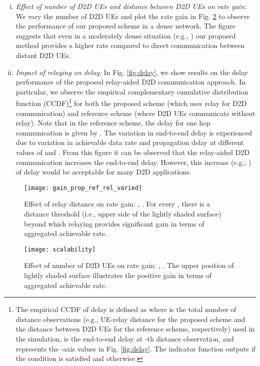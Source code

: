 \documentclass[twocolumn,10pt]{IEEEtran}
\begin{document}
\begin{enumerate}[(i)]
\item \textit{Effect of number of D2D UEs and distance between D2D UEs on rate gain:} We vary the number of D2D UEs and plot the rate gain in Fig. \ref{fig:scal} to observe the performance of our proposed scheme in a dense network. The figure suggests that even in a moderately dense situation (e.g., ) our proposed method provides a higher rate compared to direct communication between distant D2D UEs.


\item \textit{Impact of  relaying on delay:} In Fig. \ref{fig:delay}, we show results on the delay performance of the proposed relay-aided D2D communication approach. In particular, we observe the empirical complementary cumulative distribution function (CCDF)\footnote{The empirical CCDF of delay is defined as  where  is the total number of distance observations (e.g., UE-relay distance for the proposed scheme and the distance between D2D UEs for the reference scheme, respectively) used in the simulation,  is the end-to-end delay at -th distance observation, and   represents the -axis values in Fig. \ref{fig:delay}. The indicator function  outputs  if the condition  is satisfied and  otherwise.} for both the proposed scheme (which uses relay for D2D communication) and reference scheme (where D2D UEs communicate without relay). Note that in the reference scheme, the delay for one hop communication is given by . The variation in end-to-end delay is experienced due to variation in achievable data rate and propagation delay at different values of  and . From this figure it can be observed that the relay-aided D2D communication increases the end-to-end delay. However,  this increase (e.g., ) of delay would be acceptable for many D2D applications.




\end{enumerate}

\begin{figure}[h t b]
\centering
\texttt{[image: gain\_prop\_ref\_rel\_varied]}
\caption{Effect of relay distance on rate gain: ,  . For every , there is a distance threshold (i.e., upper side of the lightly shaded surface) beyond which relaying provides significant gain in terms of aggregated achievable rate.} 
\label{fig:rel_var_mp}
\end{figure}


\begin{figure}[h t b]
\centering
\texttt{[image: scalability]}
\caption{Effect of number of D2D UEs on rate gain: , . The upper position of lightly shaded surface illustrates the positive gain in terms of aggregated achievable rate.}
\label{fig:scal}
\end{figure}
\end{document}
